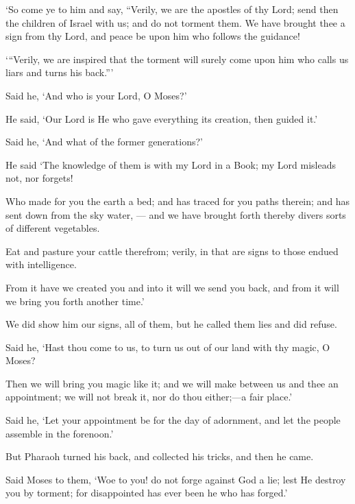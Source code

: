 \documentclass[fontsize=14pt, letterpaper, notitlepage, openany, DIV=12]{scrbook} %
\begin{document}
\noindent[20:47]
`So come ye to him and say, ``Verily, we are the apostles of thy Lord; send then the
children of Israel with us; and do not torment them. We have brought thee a sign from thy Lord,
and peace be upon him who follows the guidance!

\noindent[20:48]
`\hspace{0.1em}``Verily, we are inspired that the torment will surely come upon him who calls us liars
and turns his back.''\hspace{0.1em}'

\noindent[20:49]
Said he, `And who is your Lord, O Moses?'

\noindent[20:50]
He said, `Our Lord is He who gave everything its creation, then guided it.'

\noindent[20:51]
Said he, `And what of the former generations?'

\noindent[20:52]
He said `The knowledge of them is with my Lord in a Book; my Lord misleads not, nor
forgets!

\noindent[20:53]
Who made for you the earth a bed; and has traced for you paths therein; and has sent
down from the sky water, --- and we have brought forth thereby divers sorts of different
vegetables.

\noindent[20:54]
Eat and pasture your cattle therefrom; verily, in that are signs to those endued with
intelligence.

\noindent[20:55]
From it have we created you and into it will we send you back, and from it will we bring
you forth another time.'

\noindent[20:56]
We did show him our signs, all of them, but he called them lies and did refuse.

\noindent[20:57]
Said he, `Hast thou come to us, to turn us out of our land with thy magic, O Moses?

\noindent[20:58]
Then we will bring you magic like it; and we will make between us and thee an
appointment; we will not break it, nor do thou either;---a fair place.'

\noindent[20:59]
Said he, `Let your appointment be for the day of adornment, and let the people assemble
in the forenoon.'

\noindent[20:60]
But Pharaoh turned his back, and collected his tricks, and then he came.

\noindent[20:61]
Said Moses to them, `Woe to you! do not forge against God a lie; lest He destroy you by
torment; for disappointed has ever been he who has forged.'
\end{document}
